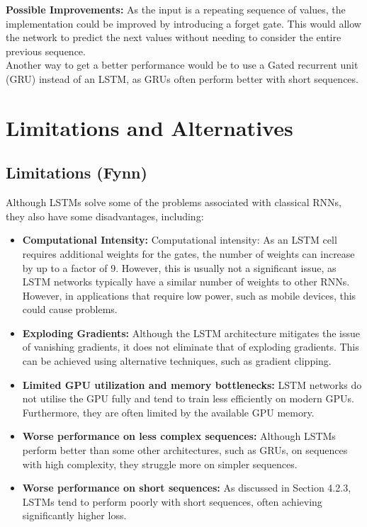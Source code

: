 \documentclass[twoside,a4paper,10pt,DIV=12,BCOR=12mm]{scrartcl}
\begin{document}
\textbf{Possible Improvements:}
As the input is a repeating sequence of values, the implementation could be improved by introducing a forget gate. This would allow the network to predict the next values without needing to consider the entire previous sequence.\cite{forget-gate}\\
Another way to get a better performance would be to use a Gated recurrent unit (GRU) instead of an LSTM, as GRUs often perform better with short sequences.\cite{cahuantzi2023lstmvsgru}
\section{Limitations and Alternatives}

\subsection{Limitations (Fynn)}
Although LSTMs solve some of the problems associated with classical RNNs, they also have some disadvantages, including:
\begin{itemize}
    \item \textbf{Computational Intensity:} Computational intensity: As an LSTM cell requires additional weights for the gates, the number of weights can increase by up to a factor of \begin{math} 9 \end{math}. However, this is usually not a significant issue, as LSTM networks typically have a similar number of weights to other RNNs.\cite{hochreiter1997lstm}\\ However, in applications that require low power, such as mobile devices, this could cause problems. \cite{rizakisFPGAlstm}
    \item \textbf{Exploding Gradients:} Although the LSTM architecture mitigates the issue of vanishing gradients, it does not eliminate that of exploding gradients.\cite{pascanu2013rnntraining} This can be achieved using alternative techniques, such as gradient clipping.\cite{gradient-clipping, pascanu2013rnntraining}
    \item \textbf{Limited GPU utilization and memory bottlenecks:} LSTM networks do not utilise the GPU fully and tend to train less efficiently on modern GPUs. Furthermore, they are often limited by the available GPU memory.\cite{zheng2018scalability, zheng2020scalability}  
    \item \textbf{Worse performance on less complex sequences:} Although LSTMs perform better than some other architectures, such as GRUs, on sequences with high complexity, they struggle more on simpler sequences.\cite{cahuantzi2023lstmvsgru} 
    \item \textbf{Worse performance on short sequences:} As discussed in Section 4.2.3, LSTMs tend to perform poorly with short sequences, often achieving significantly higher loss. \cite{bolboaca2023lstmperformance} 
\end{itemize}
\end{document}
